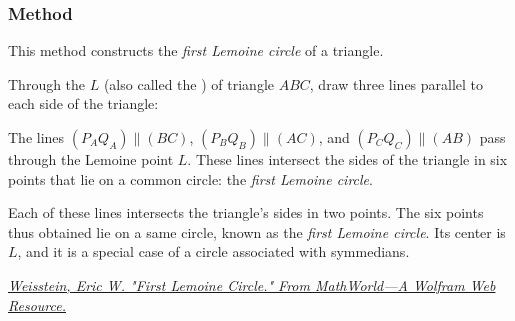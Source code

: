 \vspace{1em}
\begin{minipage}{.5\textwidth}
  \begin{center}
  \end{center}
\end{minipage}
\begin{minipage}{.5\textwidth}
\begin{tkzexample}
\end{tkzexample}
\end{minipage}

\subsubsection{Method }
\label{ssub:method_triangle_first_lemoine_circle}

This method constructs the \emph{first Lemoine circle} of a triangle.

Through the  $L$ (also called the ) of triangle $ABC$, draw three lines parallel to each side of the triangle:

The lines \( (P_AQ_A) \parallel (BC) \), \( (P_BQ_B) \parallel (AC) \), and \( (P_CQ_C) \parallel (AB) \) pass through the Lemoine point \( L \). These lines intersect the sides of the triangle in six points that lie on a common circle: the \emph{first Lemoine circle}.

Each of these lines intersects the triangle’s sides in two points. The six points thus obtained lie on a same circle, known as the \emph{first Lemoine circle}. Its center is $L$, and it is a special case of a circle associated with symmedians.
\begin{flushright}
\small
\href{https://mathworld.wolfram.com/FirstLemoineCircle.html}
{\textit{Weisstein, Eric W. "First Lemoine Circle." From MathWorld—A Wolfram Web Resource.}}
\end{flushright}

